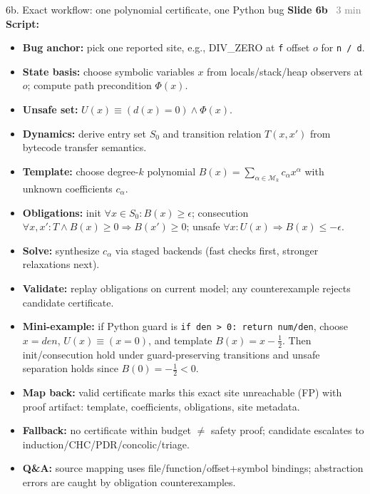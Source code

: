 \documentclass[aspectratio=169]{beamer}
\newcommand{\syncline}[2]{\textbf{#1} \hfill \textcolor{gray}{#2}}
\begin{document}
\begin{frame}[t]{6b. Exact workflow: one polynomial certificate, one Python bug}
\syncline{Slide 6b}{~3 min}
\textbf{Script:}
\scriptsize
\begin{itemize}
  \item \textbf{Bug anchor:} pick one reported site, e.g., DIV\_ZERO at \texttt{f} offset \(o\) for \texttt{n / d}.
  \item \textbf{State basis:} choose symbolic variables \(x\) from locals/stack/heap observers at \(o\); compute path precondition \(\Phi(x)\).
  \item \textbf{Unsafe set:} \(U(x)\equiv(d(x)=0)\land\Phi(x)\).
  \item \textbf{Dynamics:} derive entry set \(S_0\) and transition relation \(T(x,x')\) from bytecode transfer semantics.
  \item \textbf{Template:} choose degree-\(k\) polynomial \(B(x)=\sum_{\alpha\in\mathcal{M}_k}c_\alpha x^\alpha\) with unknown coefficients \(c_\alpha\).
  \item \textbf{Obligations:} init \(\forall x\in S_0: B(x)\ge\epsilon\); consecution \(\forall x,x': T\land B(x)\ge0\Rightarrow B(x')\ge0\); unsafe \(\forall x: U(x)\Rightarrow B(x)\le-\epsilon\).
  \item \textbf{Solve:} synthesize \(c_\alpha\) via staged backends (fast checks first, stronger relaxations next).
  \item \textbf{Validate:} replay obligations on current model; any counterexample rejects candidate certificate.
  \item \textbf{Mini-example:} if Python guard is \texttt{if den > 0: return num/den}, choose \(x=den\), \(U(x)\equiv(x=0)\), and template \(B(x)=x-\tfrac{1}{2}\). Then init/consecution hold under guard-preserving transitions and unsafe separation holds since \(B(0)=-\tfrac{1}{2}<0\).
  \item \textbf{Map back:} valid certificate marks this exact site unreachable (FP) with proof artifact: template, coefficients, obligations, site metadata.
  \item \textbf{Fallback:} no certificate within budget \(\neq\) safety proof; candidate escalates to induction/CHC/PDR/concolic/triage.
  \item \textbf{Q\&A:} source mapping uses file/function/offset+symbol bindings; abstraction errors are caught by obligation counterexamples.
\end{itemize}
\normalsize
\end{frame}
\end{document}
